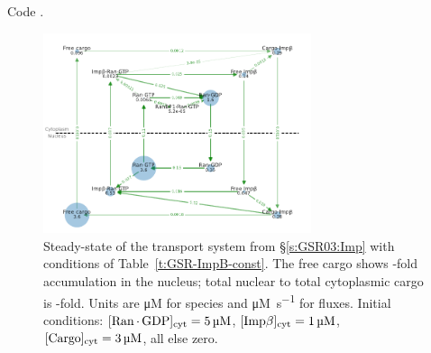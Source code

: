\documentclass[12pt,notitlepage]{article}
\begin{document}
%

Code .





\begin{figure}
\centering
\includegraphics[width=0.7\textwidth]{20210225-GSR/v2/python/b_graph1/onion}
\caption{%
	Steady-state of 
	the transport system from 
	\S\ref{s:GSR03:Imp}
	with conditions 
	of Table~\ref{t:GSR-ImpB-const}.
	The free cargo
	shows 
	\protect\unskip%
	-fold accumulation
	in the nucleus;
	total nuclear to total cytoplasmic cargo
	is
	\protect\unskip%
	-fold.
	Units are \si{\micro M} for species
	and \si{\micro M . s^{-1}} for fluxes.
	Initial conditions:
	$[\ce{Ran . GDP}]_\text{cyt} = \SI{5}{\micro M}$,
	$[\ce{Imp$\beta$}]_\text{cyt} = \SI{1}{\micro M}$,
	$[\ce{Cargo}]_\text{cyt} = \SI{3}{\micro M}$,
	all else zero.
}
\label{f:GSR-v2}
\end{figure}
\end{document}
